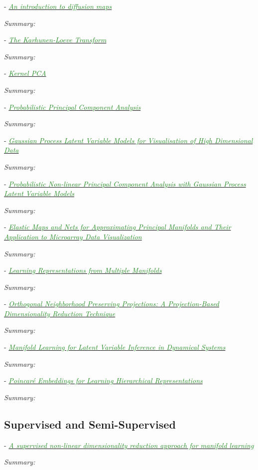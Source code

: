 \documentclass[]{article}
\newcommand{\paperentry}[4]{
            \hangindent=1cm
            \cite{#1} - \href{run:../References/#3}{\textcolor{ForestGreen}{\textit{#2}}}
            
            \noindent            
            \begin{minipage}[t]{0.1\linewidth}\hfill\end{minipage}
            \begin{minipage}[t]{0.8\linewidth}\textcolor{NavyBlue}{{\textit{Summary:}}}#4\end{minipage}
            \vspace{.25cm}
          }
\begin{document}
	\paperentry{Delaporte2008DiffusionMaps}
	{An introduction to diffusion maps}
	{Manifold_Representation_Learning/Manifold/Delaporte2008DiffusionMaps}
	{}
	
	\paperentry{Theodoris2008PCA}
	{The Karhunen-Loeve Transform}
	{}
	{}
	
	\paperentry{Theodoris2008KPCA}
	{Kernel PCA}
	{}
	{}
	
	\paperentry{Tipping1999PPCA}
	{Probabilistic Principal Component Analysis}
	{Manifold_Representation_Learning/Manifold/Tipping1999PPCA.pdf}
	{}
	
	\paperentry{Lawrence2003GPLVM}
	{Gaussian Process Latent Variable Models for Visualisation of High Dimensional Data}
	{Manifold_Representation_Learning/Manifold/Lawrence2003GPLVM.pdf}
	{}
	
	\paperentry{Lawrence2005PPCAGPLVModels}
	{Probabilistic Non-linear Principal Component Analysis with Gaussian Process Latent Variable Models}
	{Manifold_Representation_Learning/Manifold/Lawrence2005PPCAGPLVModels.pdf}
	{}
	
	\paperentry{Gorban2007ElasticMaps}
	{Elastic Maps and Nets for Approximating Principal Manifolds and Their Application to Microarray Data Visualization}
	{Manifold_Representation_Learning/Manifold/Gorban2007ElasticMaps.pdf}
	{}
	
	\paperentry{Lee2015MultipleManifolds}
	{Learning Representations from Multiple Manifolds}
	{Manifold_Representation_Learning/Manifold/Lee2015MultipleManifolds.pdf}
	{}
	
	\paperentry{Kokiopoulou2007OrthoNeighborhoodPreservingProjections}
	{Orthogonal Neighborhood Preserving Projections: A Projection-Based Dimensionality Reduction Technique}
	{Manifold_Representation_Learning/Manifold/Kokiopoulou2007OrthoNeighborhoodPreservingProjections.pdf}
	{}
	
	\paperentry{Talmon2015ManifoldLearningInDynamicalSystems}
	{Manifold Learning for Latent Variable Inference in Dynamical Systems}
	{Manifold_Representation_Learning/Manifold/Talmon2015ManifoldLearningInDynamicalSystems.pdf}
	{}
	
	\paperentry{Nickel2017PoincareEmbeddings}
	{Poincar\'{e} Embeddings for Learning Hierarchical Representations}
	{Manifold_Representation_Learning/Manifold/Nickel2017PoincareEmbeddings.pdf}
	{}
	
	\subsection{Supervised and Semi-Supervised}
	\paperentry{Raducanu2012SupervisedNonlinearDimReduction}
	{A supervised non-linear dimensionality reduction approach for manifold learning}
	{Manifold_Representation_Learning/Supervised/Raducanu2012SupervisedNonlinearDimReduction.pdf}
	{}
	
\end{document}
